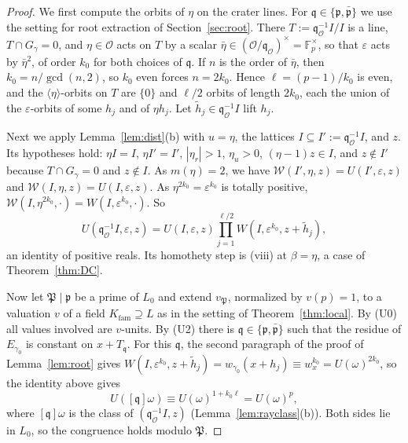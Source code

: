 \documentclass[11pt]{amsart}
\numberwithin{equation}{section}
\theoremstyle{plain}
\theoremstyle{definition}
\theoremstyle{remark}
\begin{document}
\begin{proof}
We first compute the orbits of \(\eta\) on the crater lines. For \(\mathfrak q\in\{\mathfrak p,\bar{\mathfrak p}\}\) we use the setting for root extraction of Section~\ref{sec:root}. There \(T:=\mathfrak q_{\mathcal O}^{-1}I/I\) is a line, \(T\cap G_\gamma=0\), and \(\eta\in\mathcal O\) acts on \(T\) by a scalar \(\bar\eta\in(\mathcal O/\mathfrak q_{\mathcal O})^\times=\mathbb F_p^\times\), so that \(\varepsilon\) acts by \(\bar\eta^2\), of order \(k_0\) for both choices of \(\mathfrak q\). If \(n\) is the order of \(\bar\eta\), then \(k_0=n/\gcd(n,2)\), so \(k_0\) even forces \(n=2k_0\). Hence \(\ell=(p-1)/k_0\) is even, and the \(\langle\eta\rangle\)-orbits on \(T\) are \(\{0\}\) and \(\ell/2\) orbits of length \(2k_0\), each the union of the \(\varepsilon\)-orbits of some \(h_j\) and of \(\eta h_j\). Let \(\tilde h_j\in\mathfrak q_{\mathcal O}^{-1}I\) lift \(h_j\).

Next we apply Lemma~\ref{lem:dist}(b) with \(u=\eta\), the lattices \(I\subseteq I':=\mathfrak q_{\mathcal O}^{-1}I\), and \(z\). Its hypotheses hold: \(\eta I=I\), \(\eta I'=I'\), \(|\eta_r|>1\), \(\eta_u>0\), \((\eta-1)z\in I\), and \(z\notin I'\) because \(T\cap G_\gamma=0\) and \(z\notin I\). As \(m(\eta)=2\), we have \(\mathcal W(I',\eta,z)=U(I',\varepsilon,z)\) and \(\mathcal W(I,\eta,z)=U(I,\varepsilon,z)\). As \(\eta^{2k_0}=\varepsilon^{k_0}\) is totally positive, \(\mathcal W(I,\eta^{2k_0},\cdot)=W(I,\varepsilon^{k_0},\cdot)\). So
\[U(\mathfrak q_{\mathcal O}^{-1}I,\varepsilon,z)=U(I,\varepsilon,z)\prod_{j=1}^{\ell/2}W(I,\varepsilon^{k_0},z+\tilde h_j),\]
an identity of positive reals. Its homothety step is (viii) at \(\beta=\eta\), a case of Theorem~\ref{thm:DC}.

Now let \(\mathfrak P\mid\mathfrak p\) be a prime of \(L_0\) and extend \(v_{\mathfrak P}\), normalized by \(v(p)=1\), to a valuation \(v\) of a field \(K_{\mathrm{fam}}\supseteq L\) as in the setting of Theorem~\ref{thm:local}. By (U0) all values involved are \(v\)-units. By (U2) there is \(\mathfrak q\in\{\mathfrak p,\bar{\mathfrak p}\}\) such that the residue of \(E_{\gamma_0}\) is constant on \(x+T_{\mathfrak q}\). For this \(\mathfrak q\), the second paragraph of the proof of Lemma~\ref{lem:root} gives \(W(I,\varepsilon^{k_0},z+\tilde h_j)=w_{\gamma_0}(x+h_j)\equiv w_x^{k_0}=U(\omega)^{2k_0}\), so the identity above gives
\[U([\mathfrak q]\omega)\equiv U(\omega)^{1+k_0\ell}=U(\omega)^p,\]
where \([\mathfrak q]\omega\) is the class of \((\mathfrak q_{\mathcal O}^{-1}I,z)\) (Lemma~\ref{lem:rayclass}(b)). Both sides lie in \(L_0\), so the congruence holds modulo \(\mathfrak P\).


\end{proof}
\end{document}
